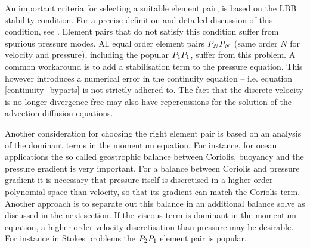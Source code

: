 An important criteria for selecting a suitable element pair, 
is based on the LBB stability condition. For a precise definition and 
detailed discussion of this condition, see \cite{gresho1988}. Element pairs 
that do not satisfy this condition suffer from spurious pressure modes. All equal order element pairs
$P_NP_N$ (same order $N$ for velocity and pressure), including the popular $P_1P_1$, suffer from this problem.
A common workaround is to add
a stabilisation term to the pressure equation. This however introduces a numerical error in 
the continuity equation -- i.e. equation \eqref{continuity_byparts} is not strictly adhered to. 
The fact that the discrete velocity is no longer divergence free may 
also have repercussions for the solution of the advection-diffusion equations.

Another consideration for choosing the right element pair is based 
on an analysis of the
dominant terms in the momentum equation. For instance, for ocean applications the 
so called geostrophic balance between Coriolis, buoyancy and the pressure gradient
is very important. For a balance between Coriolis and pressure gradient it is necessary
that pressure itself is discretised in a higher order polynomial space than velocity, so that its
gradient can match the Coriolis term. Another approach is to separate out this balance in an
additional balance solve as discussed in the next section. If the viscous term is dominant in 
the momentum equation, a higher order velocity discretisation than pressure may be 
desirable. For instance in Stokes problems the $P_2P_1$ element pair is popular.

